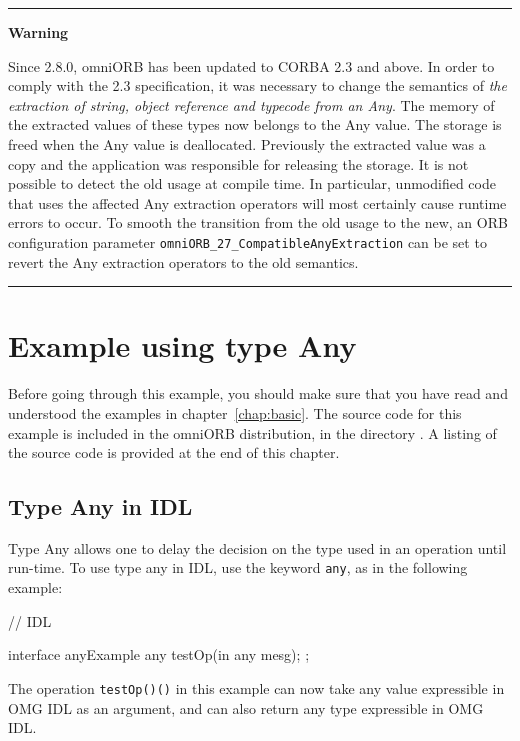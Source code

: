 \documentclass[11pt,twoside,a4paper]{book}
\newcommand{\code}[1]{\texttt{#1}}
\newcommand{\op}[1]{\texttt{#1()}}
\newenvironment{statement}%
 {\noindent\begin{minipage}{\textwidth}%
  \vspace{.5\baselineskip}%
  \noindent\rule{\textwidth}{2pt}%
  \vspace{.25\baselineskip}%
  \begin{list}{}{\setlength{\listparindent}{0em}%
                 \setlength{\itemindent}{0em}%
                 \setlength{\leftmargin}{1.5em}%
                 \setlength{\rightmargin}{\leftmargin}%
                 \setlength{\topsep}{0pt}%
                 \setlength{\partopsep}{0pt}}
  \item\relax}
 {\end{list}%
  \vspace{-.25\baselineskip}%
  \noindent\rule{\textwidth}{2pt}%
  \vspace{.5\baselineskip}%
  \end{minipage}}
\newcommand{\file}{\begingroup \urlstyle{tt}\Url}
\begin{document}
\begin{statement}
\centerline{\textbf{Warning}}

Since 2.8.0, omniORB has been updated to CORBA 2.3 and above. In order
to comply with the 2.3 specification, it was necessary to change the
semantics of \emph{the extraction of string, object reference and
typecode from an Any}. The memory of the extracted values of these
types now belongs to the Any value. The storage is freed when the Any
value is deallocated.  Previously the extracted value was a copy and
the application was responsible for releasing the storage. It is not
possible to detect the old usage at compile time. In particular,
unmodified code that uses the affected Any extraction operators will
most certainly cause runtime errors to occur.  To smooth the
transition from the old usage to the new, an ORB configuration
parameter \code{omniORB\_27\_CompatibleAnyExtraction} can be set to
revert the Any extraction operators to the old semantics.

\end{statement}


\section{Example using type Any}

Before going through this example, you should make sure that you have
read and understood the examples in chapter~\ref{chap:basic}.  The
source code for this example is included in the omniORB distribution,
in the directory \file{src/examples/anyExample}. A listing of the
source code is provided at the end of this chapter.

\subsection{Type Any in IDL}
Type Any allows one to delay the decision on the type used in an
operation until run-time. To use type any in IDL, use the keyword
\code{any}, as in the following example:

\begin{idllisting}
// IDL

interface anyExample {
  any testOp(in any mesg);
};
\end{idllisting}


\noindent The operation \op{testOp()} in this example can now take any
value expressible in OMG IDL as an argument, and can also return any
type expressible in OMG IDL.
\end{document}
